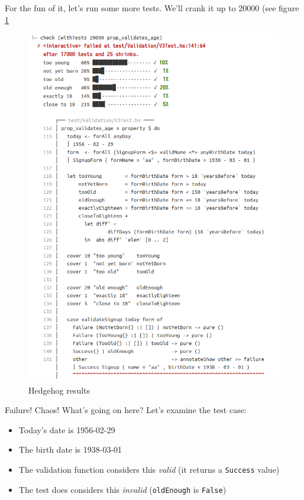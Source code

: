 For the fun of it, let's run some more tests. We'll crank it up to
20000 (see figure \ref{fig:hedgehog6}
\begin{figure}[htbp]
 \centering
 \includegraphics[width=\linewidth]{./pics/hedgehog6.png}
 \caption{Hedgehog results}
 \label{fig:hedgehog6}
\end{figure}

\noindent Failure! Chaos! What's going on here? Let's examine the test case:

\begin{itemize}

\item
  Today's date is 1956-02-29
\item
  The birth date is 1938-03-01
\item
  The validation function considers this \emph{valid} (it returns a
  \texttt{Success} value)
\item
  The test does considers this \emph{invalid} (\texttt{oldEnough} is
  \texttt{False})
\end{itemize}

